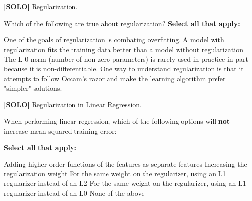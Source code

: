 \documentclass[11pt,addpoints,answers]{exam}
\newcommand{\solo}{\textbf{[SOLO]} }
\begin{document}
\begin{questions}
    \question[2] \solo Regularization.

Which of the following are true about regularization?
    \textbf{Select all that apply:}
    {%
    \checkboxchar{$\Box$} \checkedchar{$\blacksquare$}
    \begin{checkboxes}
        \CorrectChoice One of the goals of regularization is combating overfitting.  
        \choice A model with regularization fits the training data better than a model without regularization 
        \CorrectChoice The L-0 norm (number of non-zero parameters) is rarely used in practice in part because it is non-differentiable. 
        \CorrectChoice One way to understand regularization is that it attempts to follow Occam's razor and make the learning algorithm prefer "simpler" solutions.
    \end{checkboxes}
    }
    
    
\question[6] \solo Regularization in Linear Regression. 

When performing linear regression, which of the following options will \textbf{not} increase mean-squared training error:
    
    \textbf{Select all that apply:}
        {%
    \checkboxchar{$\Box$} \checkedchar{$\blacksquare$}
        \begin{checkboxes}
        \CorrectChoice Adding higher-order functions of the features as separate features
        \choice Increasing the regularization weight
        \choice For the same weight on the regularizer, using an L1 regularizer instead of an L2
        \choice For the same weight on the regularizer, using an L1 regularizer instead of an L0
        \choice None of the above
        \end{checkboxes}
        }


\end{questions}
\end{document}

